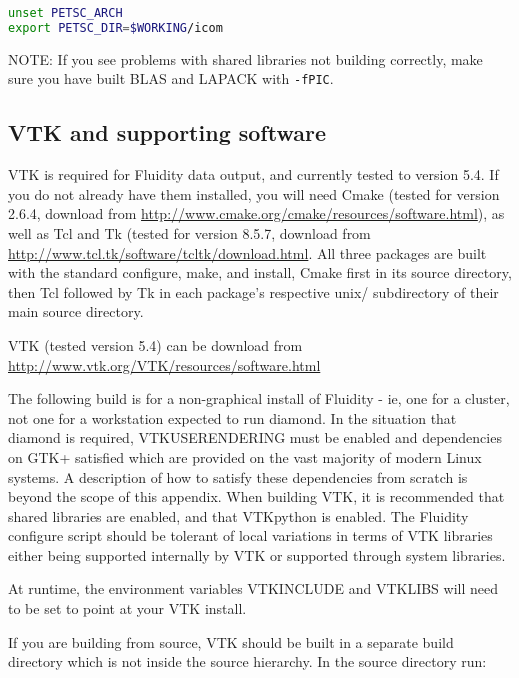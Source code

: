 \begin{lstlisting}[language=bash]
unset PETSC_ARCH
export PETSC_DIR=$WORKING/icom
\end{lstlisting}

NOTE: If you see problems with shared libraries not building correctly, make
sure you have built BLAS and LAPACK with \lstinline[language=bash]+-fPIC+.

\subsection{VTK and supporting software}
\label{sect:required_libraries_vtk}

VTK is required for Fluidity data output, and currently tested to version 5.4.
If you do not already have them installed, you will need Cmake (tested for
version 2.6.4, download from
\url{http://www.cmake.org/cmake/resources/software.html}), as well as Tcl and
Tk (tested for version 8.5.7, download from
\url{http://www.tcl.tk/software/tcltk/download.html}. All three packages are
built with the standard configure, make, and install, Cmake first in its source
directory, then Tcl followed by Tk in each package's respective unix/
subdirectory of their main source directory.

VTK (tested version 5.4) can be download from
\url{http://www.vtk.org/VTK/resources/software.html}

The following build is for a non-graphical install of Fluidity - ie, one for a
cluster, not one for a workstation expected to run diamond. In the situation
that diamond is required, VTK{\textunderscore}USE{\textunderscore}RENDERING
must be enabled and dependencies on GTK+ satisfied which are provided on the
vast majority of modern Linux systems. A description of how to satisfy these
dependencies from scratch is beyond the scope of this appendix. When building
VTK, it is recommended that shared libraries are enabled, and that VTKpython is
enabled. The Fluidity configure script should be tolerant of local variations
in terms of VTK libraries either being supported internally by VTK or supported
through system libraries.

At runtime, the environment variables VTK{\textunderscore}INCLUDE and
VTK{\textunderscore}LIBS will need to be set to point at your VTK install.

If you are building from source, VTK should be built in a separate build
directory which is not inside the source hierarchy. In the source directory
run:

